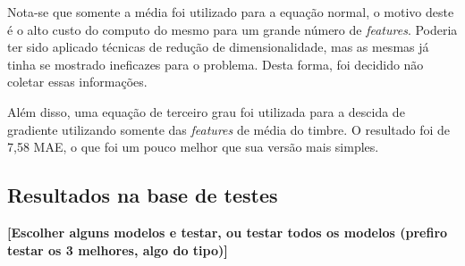 \documentclass[conference]{IEEEtran}
\begin{document}
Nota-se que somente a média foi utilizado para a equação normal, o motivo deste é o alto custo do computo do mesmo para um grande número de \emph{features}. Poderia ter sido aplicado técnicas de redução de dimensionalidade, mas as mesmas já tinha se mostrado ineficazes para o problema. Desta forma, foi decidido não coletar essas informações.

Além disso, uma equação de terceiro grau foi utilizada para a descida de gradiente utilizando somente das \emph{features} de média do timbre. O resultado foi de 7,58 MAE, o que foi um pouco melhor que sua versão mais simples.

\subsection{Resultados na base de testes }

\textbf{[Escolher alguns modelos e testar, ou testar todos os modelos (prefiro testar os 3 melhores, algo do tipo)]}



\end{document}
